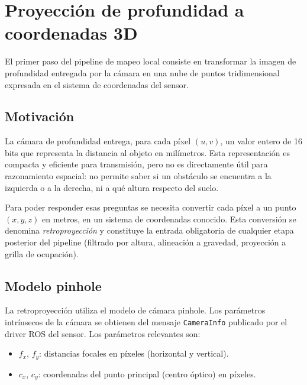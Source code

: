 %

\section{Proyección de profundidad a coordenadas 3D}
\label{sec:lm-depth-projector}

El primer paso del pipeline de mapeo local consiste en transformar la imagen
de profundidad entregada por la cámara en una nube de puntos tridimensional
expresada en el sistema de coordenadas del sensor.

\subsection{Motivación}

La cámara de profundidad entrega, para cada píxel $(u, v)$, un valor entero
de 16 bits que representa la distancia al objeto en milímetros. Esta
representación es compacta y eficiente para transmisión, pero no es
directamente útil para razonamiento espacial: no permite saber si un
obstáculo se encuentra a la izquierda o a la derecha, ni a qué altura
respecto del suelo.

Para poder responder esas preguntas se necesita convertir cada píxel a un
punto $(x, y, z)$ en metros, en un sistema de coordenadas conocido. Esta
conversión se denomina \emph{retroproyección} y constituye la entrada
obligatoria de cualquier etapa posterior del pipeline (filtrado por altura,
alineación a gravedad, proyección a grilla de ocupación).

\subsection{Modelo pinhole}

La retroproyección utiliza el modelo de cámara pinhole. Los parámetros
intrínsecos de la cámara se obtienen del mensaje \texttt{CameraInfo}
publicado por el driver ROS del sensor. Los parámetros relevantes son:

\begin{itemize}
  \item $f_x$, $f_y$: distancias focales en píxeles (horizontal y vertical).
  \item $c_x$, $c_y$: coordenadas del punto principal (centro óptico) en
        píxeles.
\end{itemize}

